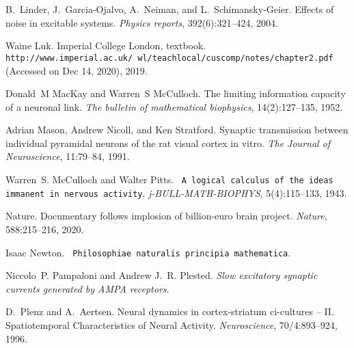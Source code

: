 \begin{DoxyDescription}
\item[\label{citelist_CITEREF_ThreeStateUnidirectional:2004}%
\mbox{[}35\mbox{]}]B.~Linder, J.~Garcia-\/\+Ojalvo, A.~Neiman, and L.~Schimansky-\/\+Geier. Effects of noise in excitable systems. {\itshape Physics reports}, 392(6)\+:321--424, 2004.


\item[\label{citelist_CITEREF_WiringDominance:2019}%
\mbox{[}36\mbox{]}]Waine Luk. Imperial College London, textbook. {\texttt{ http\+://www.\+imperial.\+ac.\+uk/~wl/teachlocal/cuscomp/notes/chapter2.\+pdf}} (Accessed on Dec 14, 2020), 2019.


\item[\label{citelist_CITEREF_mackay1952limiting}%
\mbox{[}37\mbox{]}]Donald~M Mac\+Kay and Warren~S Mc\+Culloch. The limiting information capacity of a neuronal link. {\itshape The bulletin of mathematical biophysics}, 14(2)\+:127--135, 1952.


\item[\label{citelist_CITEREF_SynapticTransmissionMason:1991}%
\mbox{[}38\mbox{]}]Adrian Mason, Andrew Nicoll, and Ken Stratford. Synaptic transmission between individual pyramidal neurons of the rat visual cortex in vitro. {\itshape The Journal of Neuroscience}, 11\+:79--84, 1991.


\item[\label{citelist_CITEREF_LogicalCalculusMcCulloch:1943}%
\mbox{[}39\mbox{]}]Warren~S. Mc\+Culloch and Walter Pitts. {\texttt{ A logical calculus of the ideas immanent in nervous activity}}. {\itshape j-\/\+BULL-\/\+MATH-\/\+BIOPHYS}, 5(4)\+:115--133, 1943. 


\item[\label{citelist_CITEREF_EuroBrainImplosion:2020}%
\mbox{[}40\mbox{]}]Nature. Documentary follows implosion of billion-\/euro brain project. {\itshape Nature}, 588\+:215--216, 2020. 


\item[\label{citelist_CITEREF_NewtonPrincipia:1687}%
\mbox{[}41\mbox{]}]Isaac Newton. {\texttt{ Philosophiae naturalis principia mathematica}}.


\item[\label{citelist_CITEREF_SlowSynapticCurrents:2022}%
\mbox{[}42\mbox{]}]Niccolo~P. Pampaloni and Andrew J.~R. Plested. {\itshape Slow excitatory synaptic currents generated by AMPA receptors}. 


\item[\label{citelist_CITEREF_SpatiotemporalPlenz:1996}%
\mbox{[}43\mbox{]}]D.~Plenz and A.~Aertsen. Neural dynamics in cortex-\/striatum ci-\/cultures -- II. Spatiotemporal Characteristics of Neural Activity. {\itshape Neuroscience}, 70/4\+:893--924, 1996.



\end{DoxyDescription}
